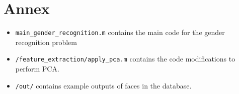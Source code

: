 \section{Annex}
\label{sec:ann}

\begin{itemize}
	\item \texttt{main\_gender\_recognition.m} contains the main code for the gender recognition problem
	\item \texttt{/feature\_extraction/apply\_pca.m} contains the code modifications to perform PCA.
	\item \texttt{/out/} contains example outputs of faces in the database.
\end{itemize}
